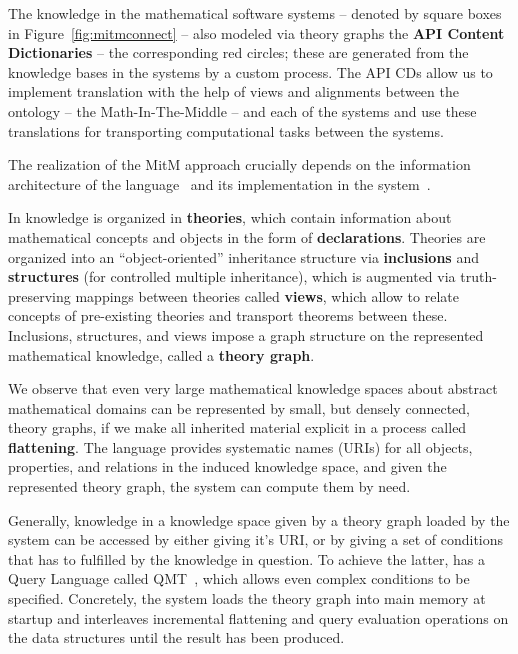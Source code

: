 The knowledge in the mathematical software systems -- denoted by square boxes in
Figure~\ref{fig:mitmconnect} -- also modeled via \ommt theory graphs the \textbf{API
  Content Dictionaries} -- the corresponding red circles; these are generated from the
knowledge bases in the systems by a custom process. The API CDs allow us to implement
translation with the help of \ommt views and alignments between the ontology -- the
Math-In-The-Middle -- and each of the systems and use these translations for transporting
computational tasks between the systems. 

The realization of the MitM approach crucially depends on the information architecture of
the \ommt language~\cite{Kohlhase:OMDoc1.2,RabKoh:WSMSML13} and its implementation in the
\mmt system~\cite{Rabe:MAGMS13,uniformal:on}.

In \ommt knowledge is organized in \textbf{theories}, which contain information about
mathematical concepts and objects in the form of \textbf{declarations}. Theories are
organized into an ``object-oriented'' inheritance structure via \textbf{inclusions} and
\textbf{structures} (for controlled multiple inheritance), which is augmented via
truth-preserving mappings between theories called \textbf{views}, which allow to relate
concepts of pre-existing theories and transport theorems between these. Inclusions,
structures, and views impose a graph structure on the represented mathematical knowledge,
called a \textbf{theory graph}. 

We observe that even very large mathematical knowledge spaces about abstract mathematical
domains can be represented by small, but densely connected, theory graphs, if we make all
inherited material explicit in a process called \textbf{flattening}. The \ommt language
provides systematic names (\mmt URIs) for all objects, properties, and relations in the
induced knowledge space, and given the represented theory graph, the \mmt system can
compute them by need. 

Generally, knowledge in a knowledge space given by a theory graph loaded by the \mmt
system can be accessed by either giving it's \mmt URI, or by giving a set of conditions
that has to fulfilled by the knowledge in question. To achieve the latter, \mmt has a
Query Language called QMT~\cite{Rabe:qlfml12}, which allows even complex conditions to be
specified. Concretely, the \mmt system loads the theory graph into main memory at startup
and interleaves incremental flattening and query evaluation operations on the \mmt data
structures until the result has been produced. 


